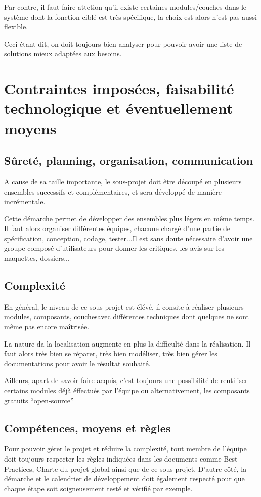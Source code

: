 Par contre, il faut faire attetion qu'il	existe certaines modules/couches dans le système dont la fonction ciblé est très spécifique, la choix est alors n'est pas aussi flexible. 

Ceci étant dit, on doit toujours bien analyser pour pouvoir avoir une liste de solutions mieux adaptées aux besoins.

\section{Contraintes imposées, faisabilité technologique et éventuellement moyens}

    \subsection{Sûreté, planning, organisation, communication}
	A cause de sa taille importante, le sous-projet doit être découpé en  plusieurs ensembles successifs et complémentaires, et sera développé de manière incrémentale.

	Cette démarche permet de développer des ensembles plus légers en même temps. Il faut alors organiser différentes équipes, chacune chargé d'une partie de spécification, conception, codage, tester...Il est sans doute nécessaire d'avoir une groupe composé d'utilisateurs pour donner les critiques, les avis sur les maquettes, dossiers...

    \subsection{Complexité} 
	En général, le niveau de ce sous-projet est élévé, il consite à réaliser plusieurs modules, composants, couchesavec différentes techniques dont quelques ne sont même pas encore maîtrisée.
	 
	La nature da la localisation augmente	en plus la difficulté dans la réalisation. Il faut alors très bien se réparer, très bien modéliser, très bien gérer les documentations pour avoir le résultat souhaité. 
	
	Ailleurs, apart de savoir faire acquis, c'est toujours une possibilité de reutiliser certains modules déjà éffectués 
	par l'équipe ou alternativement, les composants gratuits ``open-source''

    \subsection{Compétences, moyens et règles}    
	Pour pouvoir gérer le projet et réduire la complexité, tout membre de l’équipe doit toujours respecter les règles indiquées dans les documents comme Best Practices, Charte du projet global ainsi que de ce sous-projet. D’autre côté, la démarche et le calendrier de développement doit également respecté pour que chaque étape soit soigneusement testé et vérifié par exemple.        

